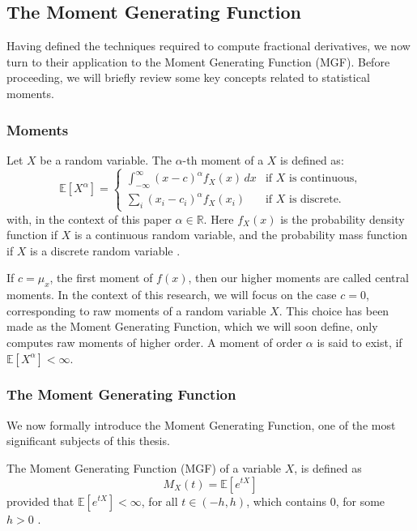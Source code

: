 \subsection{The Moment Generating Function}\label{s:MGF}
Having defined the techniques required to compute fractional derivatives, we now turn to their application to the Moment Generating Function (MGF). Before proceeding, we will briefly review some key concepts related to statistical moments.
\subsubsection{Moments}
\begin{definition}
    Let \(X\) be a random variable.
    The \(\alpha\)-th moment of a \(X\) is defined as:
   \[
\mathbb{E}[X^\alpha] = 
\begin{cases} 
\int_{-\infty}^{\infty} (x - c)^\alpha f_X(x) \, dx & \text{if } X \text{ is continuous,} \\ 
\sum_{i} (x_i - c_ i)^\alpha f_X(x_i) & \text{if } X \text{ is discrete.} 
\end{cases}
\] with, in the context of this paper \(\alpha \in \mathbb{R}\). Here \(f_X(x)\) is the probability density function if \(X\) is a continuous random variable, and the probability mass function if \(X\) is a discrete random variable \cite{feller1957}.
\end{definition}

If \(c = \mu_x\), the first moment of \(f(x)\), then our higher moments are called central moments. In the context of this research, we will focus on the case \(c = 0\), corresponding to raw moments of a random variable \(X\). This choice has been made as the Moment Generating Function, which we will soon define, only computes raw moments of higher order. A moment of order \(\alpha\) is said to exist, if \(\mathbb{E}[X^\alpha] < \infty\).

\subsubsection{The Moment Generating Function}
We now formally introduce the Moment Generating Function, one of the most significant subjects of this thesis.
\begin{definition}
    The Moment Generating Function (MGF) of a variable \(X\), is defined as
    \[M_X(t) = \mathbb{E}[e^{tX}]\] provided that \(\mathbb{E}[e^{tX}] < \infty\), for all  \( t \in (- h, h)\), which contains 0, for some \(h > 0\) \cite{mackey1980}.
\end{definition}

